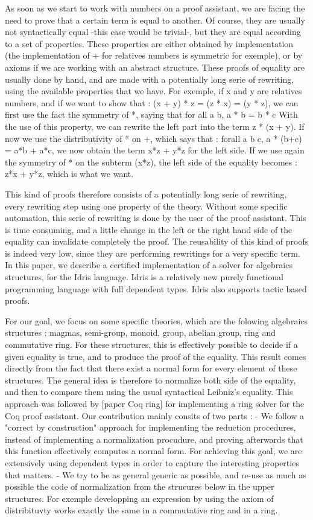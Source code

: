 \documentclass{sigplanconf}
\begin{document}
As soon as we start to work with numbers on a proof assistant, we are facing the need to prove that a certain term is equal to another. Of course, they are usually not syntactically equal -this case would be trivial-, but they are equal according to a set of properties. These properties are either obtained by implementation (the implementation of + for relatives numbers is symmetric for exemple), or by axioms if we are working with an abstract structure.
These proofs of equality are usually done by hand, and are made with a potentially long serie of rewriting, using the available properties that we have. For exemple, if x and y are relatives numbers, and if we want to show that :
(x + y) * z = (z * x) = (y * z), we can first use the fact the symmetry of *, saying that
for all a b, a * b = b * c
With the use of this property, we can rewrite the left part into the term z * (x + y).
If now we use the distributivity of * on +, which says that :
forall a b c, a * (b+c) = a*b + a*c,
we now obtain the term x*z + y*z for the left side.
If we use again the symmetry of * on the subterm (x*z), the left side of the equality becomes : z*x + y*z, which is what we want.

This kind of proofs therefore consists of a potentially long serie of rewriting, every rewriting step using one property of the theory. Without some specific automation, this serie of rewriting is done by the user of the proof assistant. This is time consuming, and a little change in the left or the right hand side of the equality can invalidate completely the proof. The reusability of this kind of proofs is indeed very low, since they are performing rewritings for a very specific term. In this paper, we describe a certified implementation of a solver for algebraics structures, for the Idris language. Idris is a relatively new purely functional programming language with full dependent types. Idris also supports tactic based proofs. 

For our goal, we focus on some specific theories, which are the folowing algebraics structures : magmas, semi-group, monoid, group, abelian group, ring and commutative ring.
For these structures, this is effectively possible to decide if a given equality is true, and to produce the proof of the equality. This result comes directly from the fact that there exist a normal form for every element of these structures. The general idea is therefore to normalize both side of the equality, and then to compare them using the usual syntactical Leibniz's equality.
This approach was followed by [paper Coq ring] for implementing a ring solver for the Coq proof assistant.
Our contribution mainly consits of two parts :
	- We follow a "correct by construction" approach for implementing the reduction procedures, instead of implementing a normalization procudure, and proving afterwards that this function effectively computes a normal form. For achieving this goal, we are extensively using dependent types in order to capture the interesting properties that matters. 
	- We try to be as general generic as possible, and re-use as much as possible the code of normalization from the strucures below in the upper structures. For exemple developping an expression by using the axiom of distribituvty works exactly the same in a commutative ring and in a ring.
\end{document}
